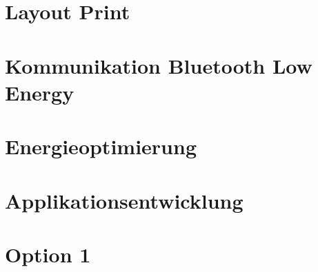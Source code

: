 \section{Layout Print}

\section{Kommunikation Bluetooth Low Energy}

\section{Energieoptimierung}



\section{Applikationsentwicklung}

\section{Option 1}






